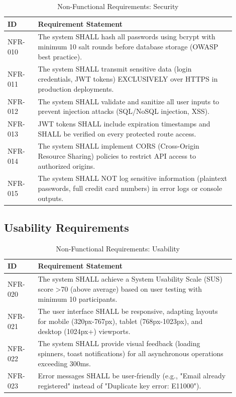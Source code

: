 \documentclass[12pt, a4paper]{report}
\begin{document}
\begin{table}[H]
\centering
\caption{Non-Functional Requirements: Security}
\label{tab:nfr_security}
\small
\begin{tabular}{@{}p{0.12\linewidth}p{0.78\linewidth}@{}}
\toprule
\textbf{ID} & \textbf{Requirement Statement} \\
\midrule
NFR-010 & The system SHALL hash all passwords using bcrypt with minimum 10 salt rounds before database storage (OWASP best practice). \\
NFR-011 & The system SHALL transmit sensitive data (login credentials, JWT tokens) EXCLUSIVELY over HTTPS in production deployments. \\
NFR-012 & The system SHALL validate and sanitize all user inputs to prevent injection attacks (SQL/NoSQL injection, XSS). \\
NFR-013 & JWT tokens SHALL include expiration timestamps and SHALL be verified on every protected route access. \\
NFR-014 & The system SHALL implement CORS (Cross-Origin Resource Sharing) policies to restrict API access to authorized origins. \\
NFR-015 & The system SHALL NOT log sensitive information (plaintext passwords, full credit card numbers) in error logs or console outputs. \\
\bottomrule
\end{tabular}
\end{table}

\subsection{Usability Requirements}

\begin{table}[H]
\centering
\caption{Non-Functional Requirements: Usability}
\label{tab:nfr_usability}
\small
\begin{tabular}{@{}p{0.12\linewidth}p{0.78\linewidth}@{}}
\toprule
\textbf{ID} & \textbf{Requirement Statement} \\
\midrule
NFR-020 & The system SHALL achieve a System Usability Scale (SUS) score \textgreater 70 (above average) based on user testing with minimum 10 participants. \\
NFR-021 & The user interface SHALL be responsive, adapting layouts for mobile (320px-767px), tablet (768px-1023px), and desktop (1024px+) viewports. \\
NFR-022 & The system SHALL provide visual feedback (loading spinners, toast notifications) for all asynchronous operations exceeding 300ms. \\
NFR-023 & Error messages SHALL be user-friendly (e.g., "Email already registered" instead of "Duplicate key error: E11000"). \\
\bottomrule
\end{tabular}
\end{table}
\end{document}
